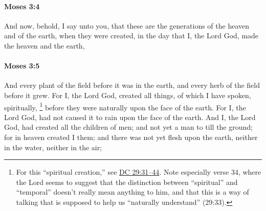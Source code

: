 
		\paragraph{Moses 3:4} %
			\label{MOSES-3-4}

			And now, behold, I say unto you, that these are the generations of the heaven and of the earth, when they were created, in the day that I, the Lord God, made the heaven and the earth,


		\paragraph{Moses 3:5} %
			\label{MOSES-3-5}

			And every plant of the field before it was in the earth, and every herb of the field before it grew. For I, the Lord God, created all things, of which I have spoken, spiritually,%
				\footnote{%
					For this ``spiritual creation,'' see \hyperref[DC29-31]{DC 29:31--44}. Note especially verse 34, where the Lord seems to suggest that the distinction between ``spiritual'' and ``temporal'' doesn't really mean anything to him, and that this is a way of talking that is supposed to help us ``naturally understand'' (29:33).
					}
			before they were naturally upon the face of the earth. For I, the Lord God, had not caused it to rain upon the face of the earth. And I, the Lord God, had created all the children of men; and not yet a man to till the ground; for in heaven created I them; and there was not yet flesh upon the earth, neither in the water, neither in the air;

